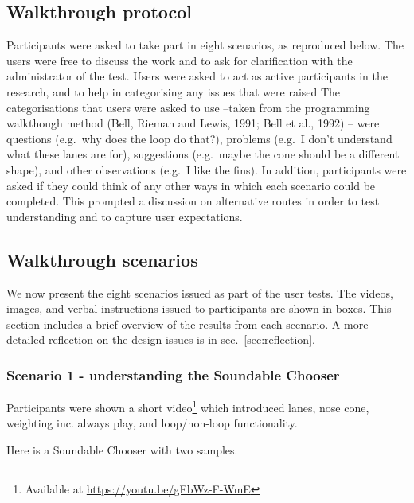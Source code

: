\documentclass{ppig}
\begin{document}
\hypertarget{walkthrough-protocol}{%
\subsection{Walkthrough protocol}\label{walkthrough-protocol}}

Participants were asked to take part in eight scenarios, as reproduced
below. The users were free to discuss the work and to ask for
clarification with the administrator of the test. Users were asked to
act as active participants in the research, and to help in categorising
any issues that were raised The categorisations that users were asked to
use --taken from the programming walkthough method (Bell, Rieman and
Lewis, 1991; Bell et al., 1992) -- were questions (e.g.~why does the
loop do that?), problems (e.g.~I don't understand what these lanes are
for), suggestions (e.g.~maybe the cone should be a different shape), and
other observations (e.g.~I like the fins). In addition, participants
were asked if they could think of any other ways in which each scenario
could be completed. This prompted a discussion on alternative routes in
order to test understanding and to capture user expectations.

\hypertarget{walkthrough-scenarios}{%
\subsection{Walkthrough scenarios}\label{walkthrough-scenarios}}

We now present the eight scenarios issued as part of the user tests. The
videos, images, and verbal instructions issued to participants are shown
in boxes. This section includes a brief overview of the results from
each scenario. A more detailed reflection on the design issues is in
sec.~\ref{sec:reflection}.

\hypertarget{scenario-1---understanding-the-soundable-chooser}{%
\subsubsection{Scenario 1 - understanding the Soundable
Chooser}\label{scenario-1---understanding-the-soundable-chooser}}

Participants were shown a short video\footnote{Available at
  \url{https://youtu.be/gFbWz-F-WmE}} which introduced lanes, nose cone,
weighting inc. always play, and loop/non-loop functionality.

Here is a Soundable Chooser with two samples.
\end{document}
